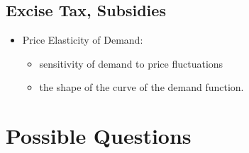 \documentclass[
]{ltjarticle}
\providecommand{\tightlist}{%
  \setlength{\itemsep}{0pt}\setlength{\parskip}{0pt}}
\begin{document}
\hypertarget{excise-tax-subsidies}{%
\subsection{Excise Tax, Subsidies}\label{excise-tax-subsidies}}

\begin{itemize}
\tightlist
\item
  Price Elasticity of Demand:

  \begin{itemize}
  \tightlist
  \item
    sensitivity of demand to price fluctuations\\
  \item
    the shape of the curve of the demand function.
  \end{itemize}
\end{itemize}

\hypertarget{possible-questions}{%
\section{Possible Questions}\label{possible-questions}}
\end{document}
